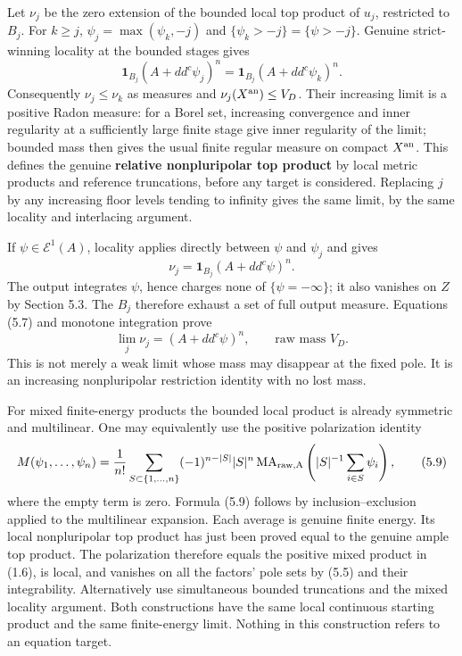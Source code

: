 \documentclass[
  10pt,
]{article}
\begin{document}
Let \(\nu_j\) be the zero extension of the bounded local top product of
\(u_j\), restricted to \(B_j\). For \(k\geq j\),
\(\psi_j=\max(\psi_k,-j)\) and \(\{\psi_k>-j\}=\{\psi>-j\}\). Genuine
strict-winning locality at the bounded stages gives \[
 \mathbf1_{B_j}(A+dd^c\psi_j)^n
                 =\mathbf1_{B_j}(A+dd^c\psi_k)^n.
\] Consequently \(\nu_j\leq\nu_k\) as measures and
\(\nu_j(X^{\rm an})\leq V_D\). Their increasing limit is a positive
Radon measure: for a Borel set, increasing convergence and inner
regularity at a sufficiently large finite stage give inner regularity of
the limit; bounded mass then gives the usual finite regular measure on
compact \(X^{\rm an}\). This defines the genuine \textbf{relative
nonpluripolar top product} by local metric products and reference
truncations, before any target is considered. Replacing \(j\) by any
increasing floor levels tending to infinity gives the same limit, by the
same locality and interlacing argument.

If \(\psi\in\mathcal E^1(A)\), locality applies directly between
\(\psi\) and \(\psi_j\) and gives \[
       \nu_j=\mathbf1_{B_j}(A+dd^c\psi)^n.                    \tag{5.7}
\] The output integrates \(\psi\), hence charges none of
\(\{\psi=-\infty\}\); it also vanishes on \(Z\) by Section 5.3. The
\(B_j\) therefore exhaust a set of full output measure. Equations (5.7)
and monotone integration prove \[
             \lim_j\nu_j=(A+dd^c\psi)^n,
                    \qquad \text{raw mass }V_D.               \tag{5.8}
\] This is not merely a weak limit whose mass may disappear at the fixed
pole. It is an increasing nonpluripolar restriction identity with no
lost mass.

For mixed finite-energy products the bounded local product is already
symmetric and multilinear. One may equivalently use the positive
polarization identity \[
 M(\psi_1,\ldots,\psi_n)=\frac1{n!}
  \sum_{S\subset\{1,\ldots,n\}}(-1)^{n-|S|}|S|^n
     \operatorname{MA}_{\rm raw,A}\left(|S|^{-1}\sum_{i\in S}\psi_i\right), \tag{5.9}
\] where the empty term is zero. Formula (5.9) follows by
inclusion--exclusion applied to the multilinear expansion. Each average
is genuine finite energy. Its local nonpluripolar top product has just
been proved equal to the genuine ample top product. The polarization
therefore equals the positive mixed product in (1.6), is local, and
vanishes on all the factors' pole sets by (5.5) and their integrability.
Alternatively use simultaneous bounded truncations and the mixed
locality argument. Both constructions have the same local continuous
starting product and the same finite-energy limit. Nothing in this
construction refers to an equation target.
\end{document}
